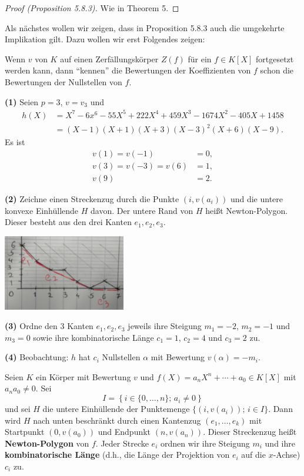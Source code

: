 \begin{proof}[Proof (Proposition 5.8.3)]
	Wie in Theorem 5.
\end{proof}

Als nächstes wollen wir zeigen, dass in Proposition 5.8.3 auch die umgekehrte Implikation gilt.
Dazu wollen wir erst Folgendes zeigen:

\bigskip Wenn $v$ von $K$ auf einen Zerfällungskörper $Z(f)$ für ein $f\in K[X]$ fortgesetzt werden kann, dann \enquote{kennen} die Bewertungen der Koeffizienten von $f$ schon die Bewertungen der Nullstellen von $f$.

\begin{Bsp*}
	\textbf{(1)} Seien $p=3$, $v= v_3$ und
	\begin{align*}
	h(X)
	&= X^7-6x^6-55X^5+222X^4 +459X^3-1674X^2-405X+1458 \\
	&=(X-1)(X+1)(X+3)(X-3)^2(X+6)(X-9).
	\end{align*}
	Es ist
	\begin{align*}
	v(1)=v(-1)&=0, \\
	v(3)=v(-3)=v(6)&=1, \\
	v(9)&=2.
	\end{align*}
	
	\bigskip \textbf{(2)} Zeichne einen Streckenzug durch die Punkte $(i,v(a_i))$ 
	und die untere konvexe Einhüllende $H$ davon. Der untere Rand von $H$ heißt Newton-Polygon. Dieser besteht aus den drei Kanten $e_1, e_2, e_3$.
	\begin{center}
		\includegraphics[width=0.4\textwidth]{img/newton_polynomial.png}
	\end{center}
	
	\bigskip \textbf{(3)} Ordne den $3$ Kanten  $e_1, e_2, e_3$ jeweils ihre Steigung $m_1=-2$, $m_2 = -1$ und $m_3=0$ sowie ihre kombinatorische Länge $c_1 = 1$, $c_2 =4$ und $c_3 = 2$ zu.
	
	\bigskip \textbf{(4)} Beobachtung: $h$ hat $c_i$ Nullstellen $\alpha$ mit Bewertung $v(\alpha) = -m_i$.
\end{Bsp*}

\begin{defi}
	Seien $K$ ein Körper mit Bewertung $v$ und $f(X)=a_nX^n+ \cdots + a_0 \in K[X]$ mit $a_n a_0 \neq 0$. Sei
	\[ I = \left\{
		i \in \{ 0, \dots, n \}; \, a_i \neq 0
	\right\}
	\]
	und sei $H$ die untere Einhüllende der Punktemenge $\{ (i,v(a_i)); \, i \in I  \}$. Dann wird $H$ nach unten beschränkt durch einen Kantenzug $(e_1, \dots, e_k)$ mit Startpunkt $(0,v(a_0))$ und Endpunkt $(n,v(a_n))$. Dieser Streckenzug heißt \textbf{Newton-Polygon} von $f$.
	Jeder Strecke $e_i$ ordnen wir ihre Steigung $m_i$ und ihre \textbf{kombinatorische Länge}
	(d.h., die Länge der Projektion von $e_i$ auf die $x$-Achse) $c_i$ zu.
\end{defi}


